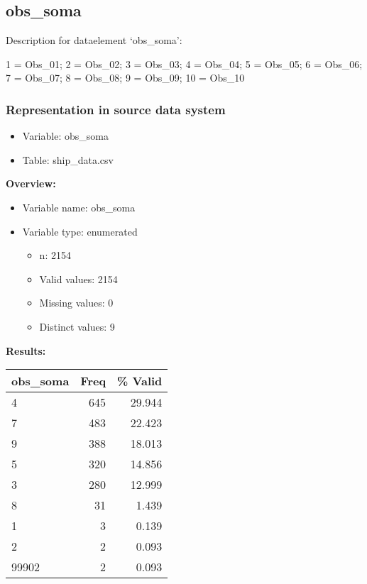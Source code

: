 \documentclass[
]{article}
\providecommand{\tightlist}{%
  \setlength{\itemsep}{0pt}\setlength{\parskip}{0pt}}
\begin{document}
\newpage

\hypertarget{obs_soma}{%
\subsection{obs\_soma}\label{obs_soma}}

Description for dataelement `obs\_soma':

1 = Obs\_01; 2 = Obs\_02; 3 = Obs\_03; 4 = Obs\_04; 5 = Obs\_05; 6 =
Obs\_06; 7 = Obs\_07; 8 = Obs\_08; 9 = Obs\_09; 10 = Obs\_10

\hypertarget{representation-in-source-data-system-20}{%
\subsubsection{\texorpdfstring{Representation in \textbf{source} data
system}{Representation in source data system}}\label{representation-in-source-data-system-20}}

\begin{itemize}
\tightlist
\item
  Variable: obs\_soma
\item
  Table: ship\_data.csv
\end{itemize}

\textbf{Overview:}

\begin{itemize}
\tightlist
\item
  Variable name: obs\_soma
\item
  Variable type: enumerated

  \begin{itemize}
  \tightlist
  \item
    n: 2154
  \item
    Valid values: 2154
  \item
    Missing values: 0
  \item
    Distinct values: 9
  \end{itemize}
\end{itemize}

\textbf{Results:}\\

\begin{table}[H]
\centering
\begin{tabular}{l|r|r}
\hline
\textbf{obs\_soma} & \textbf{Freq} & \textbf{\% Valid}\\
\hline
4 & 645 & 29.944\\
\hline
7 & 483 & 22.423\\
\hline
9 & 388 & 18.013\\
\hline
5 & 320 & 14.856\\
\hline
3 & 280 & 12.999\\
\hline
8 & 31 & 1.439\\
\hline
1 & 3 & 0.139\\
\hline
2 & 2 & 0.093\\
\hline
99902 & 2 & 0.093\\
\hline
\end{tabular}
\end{table}
\end{document}
